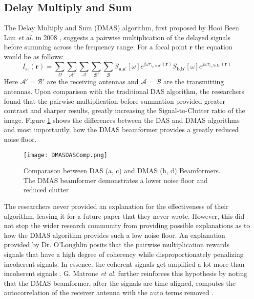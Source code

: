 \subsection{Delay Multiply and Sum}
The Delay Multiply and Sum (DMAS) algorithm, first proposed by Hooi Been Lim \textit{et al.} in 2008
\cite{h.beenlimConfocalMicrowaveImaging2008}, suggests a pairwise multiplication of the delayed signals before summing
across the frequency range. For a focal point $\textbf{r}$ the equation would be as follows:
\begingroup
\large
\begin{equation}
    I_{\varepsilon_i}(\textbf{r}) = \sum_{\Omega}\sum_{\mathcal{A}'}\sum_{\mathcal{A}}\sum_{\mathcal{B}'}\sum_{\mathcal{B}} S_{\textbf{a}, \textbf{a'}}[\omega]e^{j\omega \tau_{\varepsilon_i, \textbf{a}, \textbf{a'}}(\textbf{r})} S_{\textbf{b}, \textbf{b'}}[\omega]e^{j\omega \tau_{\varepsilon_i, \textbf{b}, \textbf{b'}}(\textbf{r})}
    \label{eq:DMASBeamformer}
\end{equation}
\endgroup
Here $\mathcal{A}' = \mathcal{B}'$ are the receiving antennas and $\mathcal{A} = \mathcal{B}$ are the transmitting
antennas. Upon comparison with the traditional DAS algorithm, the researchers found that the pairwise multiplication
before summation provided greater contrast and sharper results, greatly increasing the Signal-to-Clutter ratio of the
image. Figure \ref{fig:DMASDASComp} shows the differences between the DAS and DMAS algorithms and most
importantly, how the DMAS beamformer provides a greatly reduced noise floor.
\begin{figure}[!h]
    \texttt{[image: DMASDASComp.png]}
    \centering
    \caption{Comparason between DAS (a, c) and DMAS (b, d) Beamformers. The DMAS beamformer demonstrates a lower noise floor and reduced clutter}
    \label{fig:DMASDASComp}
\end{figure}
The researchers never provided an explanation for the effectiveness of their algorithm, leaving it for a future paper
that they never wrote. However, this did not stop the wider research community from providing possible explanations as
to how the DMAS algorithm provides such a low noise floor. An explanation provided by Dr. O'Loughlin posits that the
pairwise multiplication rewards signals that have a high degree of coherency while disproportionately penalizing
incoherent signals. In essence, the coherent signals get amplified a lot more than incoherent signals
\cite{oloughlinComparingRadarBasedBreast2019}. G. Matrone \textit{et al.} further reinforces this hypothesis by noting
that the DMAS beamformer, after the signals are time aligned, computes the autocorrelation of the receiver antenna with
the auto terms removed \cite{g.matroneDelayMultiplySum2015}.

